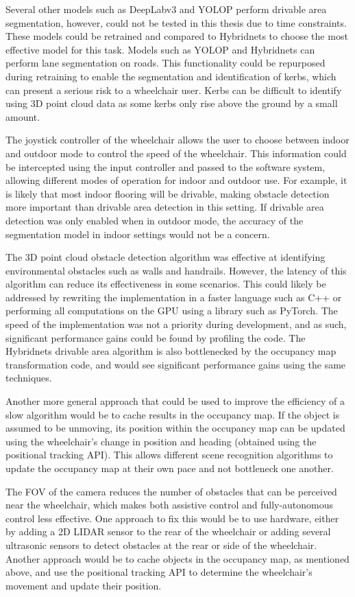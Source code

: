 Several other models such as DeepLabv3 and YOLOP perform drivable area
segmentation, however, could not be tested in this thesis due to time constraints.
These models could be retrained and compared to Hybridnets
to choose the most effective model for this task.
Models such as YOLOP and Hybridnets can perform
lane segmentation on roads. This functionality could be repurposed
during retraining to enable the segmentation and identification of kerbs,
which can present a serious risk to a wheelchair user. Kerbs can be difficult
to identify using 3D point cloud data as some kerbs only rise above
the ground by a small amount.

The joystick controller of the wheelchair allows the user to choose between
indoor and outdoor mode to control the speed of the wheelchair. This information could be intercepted using
the input controller and passed to the software system, allowing different modes
of operation for indoor and outdoor use. For example, it is likely that
most indoor flooring will be drivable, making obstacle detection more important
than drivable area detection in this setting. If drivable area detection was
only enabled when in outdoor mode, the accuracy of the segmentation model
in indoor settings would not be a concern.

The 3D point cloud obstacle detection algorithm was effective
at identifying environmental obstacles such as walls and handrails.
However, the latency of this algorithm can reduce its effectiveness
in some scenarios. This could likely be addressed by rewriting the
implementation in a faster language such as C++ or performing all
computations on the GPU using a library such as PyTorch.
The speed of the implementation was not a priority during development,
and as such, significant performance gains could be found by
profiling the code. The Hybridnets drivable area
algorithm is also bottlenecked by the occupancy map transformation code,
and would see significant performance gains using the same techniques.

Another more general approach that could be used to improve the
efficiency of a slow algorithm would be to cache results in the occupancy map.
If the object is assumed to be unmoving, its position within the occupancy
map can be updated using the wheelchair's change in position and heading
(obtained using the positional tracking API). This allows different scene recognition
algorithms to update the occupancy map at their own pace and not bottleneck
one another.

The FOV of the camera reduces the number of obstacles that can be perceived near the wheelchair,
which makes both assistive control and fully-autonomous control less effective. One approach
to fix this would be to use hardware, either by adding a 2D LIDAR sensor to the rear of the
wheelchair or adding several ultrasonic sensors to detect obstacles at the rear or side
of the wheelchair. Another approach would be to cache objects in the occupancy map,
as mentioned above, and use the positional tracking API to determine the
wheelchair's movement and update their position.

